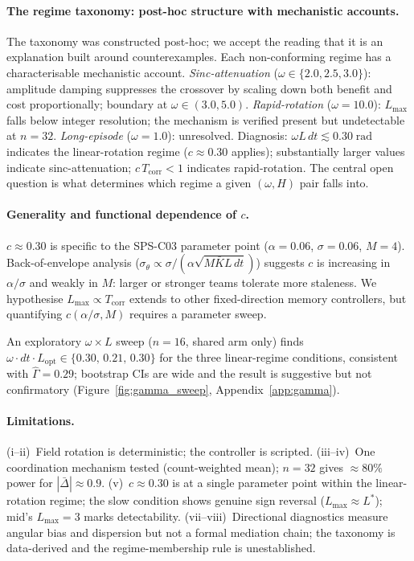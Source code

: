 \documentclass[sigconf,anonymous]{aamas}
\newcommand{\Dbar}{\bar{\Delta}}
\newcommand{\Lmax}{L_{\max}}
\newcommand{\Lopt}{L_{\mathrm{opt}}}
\newcommand{\Tcorr}{T_{\mathrm{corr}}}
\newcommand{\omdt}{\omega\!\cdot\!dt}
\begin{document}
\paragraph{The regime taxonomy: post-hoc structure with mechanistic accounts.}
The taxonomy was constructed post-hoc; we accept the reading that it is
an explanation built around counterexamples.
Each non-conforming regime has a characterisable mechanistic account.
\emph{Sinc-attenuation} ($\omega{\in}\{2.0, 2.5, 3.0\}$): amplitude
damping suppresses the crossover by scaling down both benefit and cost
proportionally; boundary at $\omega{\in}(3.0, 5.0)$.
\emph{Rapid-rotation} ($\omega{=}10.0$): $\Lmax$ falls below integer
resolution; the mechanism is verified present but undetectable at $n{=}32$.
\emph{Long-episode} ($\omega{=}1.0$): unresolved.
Diagnosis: $\omega L\,dt \lesssim 0.30\;\text{rad}$ indicates the
linear-rotation regime ($c{\approx}0.30$ applies); substantially larger
values indicate sinc-attenuation; $c\,\Tcorr{<}1$ indicates
rapid-rotation.  The central open question is what determines which
regime a given $(\omega, H)$ pair falls into.

\paragraph{Generality and functional dependence of $c$.}
$c \approx 0.30$ is specific to the SPS-C03 parameter point
($\alpha{=}0.06$, $\sigma{=}0.06$, $M{=}4$).
Back-of-envelope analysis ($\sigma_{\theta}\propto\sigma/(\alpha\sqrt{M\bar{K}L\,dt})$)
suggests $c$ is increasing in $\alpha/\sigma$ and weakly in $M$:
larger or stronger teams tolerate more staleness.
We hypothesise $\Lmax \propto \Tcorr$ extends to other fixed-direction
memory controllers, but quantifying $c(\alpha/\sigma, M)$ requires a
parameter sweep.

An exploratory $\omega{\times}L$ sweep ($n{=}16$, shared arm only)
finds $\omdt{\cdot}\Lopt{\in}\{0.30,\,0.21,\,0.30\}$ for the three
linear-regime conditions, consistent with $\hat\Gamma{=}0.29$;
bootstrap CIs are wide and the result is suggestive but not confirmatory
(Figure~\ref{fig:gamma_sweep}, Appendix~\ref{app:gamma}).

\paragraph{Limitations.}
(i--ii)~Field rotation is deterministic; the controller is scripted.
(iii--iv)~One coordination mechanism tested (count-weighted mean);
$n{=}32$ gives ${\approx}80\%$ power for $|\Dbar|{\approx}0.9$.
(v)~$c{\approx}0.30$ is at a single parameter point within the
linear-rotation regime; the slow condition shows genuine sign reversal
($\Lmax{\approx}L^*$); mid's $\Lmax{=}3$ marks detectability.
(vii--viii)~Directional diagnostics measure angular bias and dispersion
but not a formal mediation chain; the taxonomy is data-derived and the
regime-membership rule is unestablished.
\end{document}
